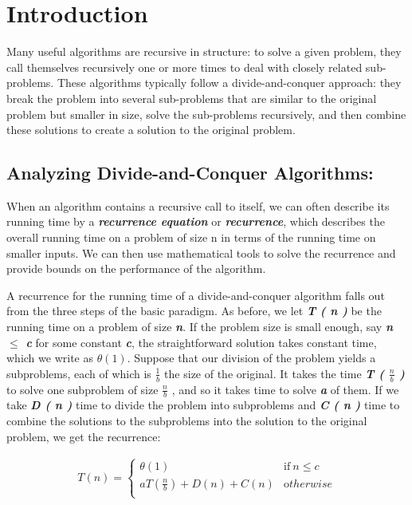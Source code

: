 \section{Introduction}

Many useful algorithms are recursive in structure: to solve a given problem, they call themselves recursively one or more times to deal with closely related sub-problems. These algorithms typically follow a divide-and-conquer approach: they break the problem into several sub-problems that are similar to the original problem but smaller in size, solve the sub-problems recursively, and then combine these solutions to create a solution to the original problem.

\subsection{Analyzing Divide-and-Conquer Algorithms:}

When an algorithm contains a recursive call to itself, we can often describe its running time by a {\bfseries\itshape recurrence equation} or {\bfseries\itshape recurrence}, which describes the overall running time on a problem of size n in terms of the running time on smaller inputs. We can then use mathematical tools to solve the recurrence and provide bounds on the performance of the algorithm. \hfill \break

A recurrence for the running time of a divide-and-conquer algorithm falls out from the three steps of the basic paradigm. As before, we let {\bfseries\itshape T ( n )} be the running time on a problem of size {\bfseries\itshape n}. If the problem size is small enough, say {\bfseries\itshape n $\leq$ c} for some constant {\bfseries\itshape c}, the straightforward solution takes constant time, which we write as $\theta ( 1 )$. Suppose that our division of the problem yields a subproblems, each of which is $\frac{1}{b}$ the size of the original. It takes the time {\bfseries\itshape T ( $\frac{n}{b}$ )} to solve one subproblem of size $\frac{n}{b}$ , and so it takes time  to solve {\bfseries\itshape a} of them. If we take {\bfseries\itshape D ( n )} time to divide the problem into subproblems and {\bfseries\itshape C ( n )} time to combine the solutions to the subproblems into the solution to the original problem, we get the recurrence: \hfill \break \break

\begin{ceqn}
\begin{align}
T( n ) = \left\{
\begin{array}{ll}
\theta ( 1 ) & \mathrm {if\ } n \leq c \\
aT(\frac{n}{b}) + D ( n ) + C ( n ) & \mathrm otherwise \\
\end{array}
\right.
\end{align}
\end{ceqn}


\pagebreak